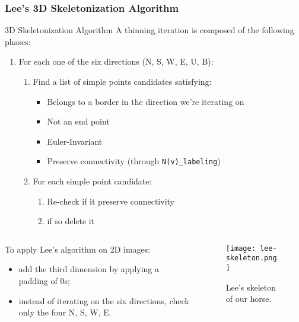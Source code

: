 \begin{frame}
  \frametitle{Lee's 3D Skeletonization Algorithm}
  \begin{block}{3D Skeletonization Algorithm}
    A thinning iteration is composed of the following phases:
    \begin{enumerate}
      \item For each one of the six directions (N, S, W, E, U, B):
            \begin{enumerate}
              \item Find a list of simple points candidates satisfying:
                    \begin{itemize}
                      \item Belongs to a border in the direction we're iterating on
                      \item Not an end point
                      \item Euler-Invariant
                      \item Preserve connectivity (through \lstinline{N(v)_labeling})
                    \end{itemize}
              \item For each simple point candidate:
                    \begin{enumerate}
                      \item Re-check if it preserve connectivity
                      \item if so delete it
                    \end{enumerate}
            \end{enumerate}
    \end{enumerate}
  \end{block}
  \begin{columns}
    \begin{column}[]{0.6\textwidth}
      \vspace{0.5cm}
      To apply Lee's algorithm on 2D images:
      \begin{itemize}
        \item add the third dimension by applying a padding of 0s;
        \item instead of iterating on the six directions, check only the four N, S, W, E.
      \end{itemize}
    \end{column}
    \begin{column}{0.4\textwidth}
      \begin{figure}
        \texttt{[image: lee-skeleton.png]}
        \caption{Lee's skeleton of our horse.}
      \end{figure}
    \end{column}
  \end{columns}

\end{frame}
